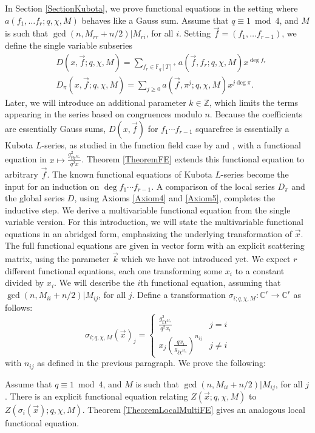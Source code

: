 \documentclass[11pt,letterpaper]{article}
\newenvironment{manualtheorem}[1]{%
  \IfBlankTF{#1}
    {\renewcommand{\themanualtheoreminner}{\unskip}}
    {\renewcommand\themanualtheoreminner{#1}}%
  \manualtheoreminner
}{\endmanualtheoreminner}
\theoremstyle{definition}
\theoremstyle{remark}
\numberwithin{equation}{section}
\theoremstyle{dotless}
\newcommand{\C}{\mathbb{C}}
\newcommand{\Z}{\mathbb{Z}}
\newcommand{\F}{\mathbb{F}}
\begin{document}
In Section \ref{SectionKubota}, we prove functional equations in the setting where $a(f_1, \ldots f_r; q, \chi, M)$ behaves like a Gauss sum. Assume that $q \equiv 1 \bmod 4$, and $M$ is such that $\gcd(n, M_{rr}+n/2) | M_{ri}$, for all $i$. Setting $\vec{f}=(f_1, \ldots f_{r-1})$, we define the single variable subseries
\begin{align}
&D(x, \vec{f}; q, \chi, M) = \sum_{f_r \in \F_q[T]^+} a(\vec{f}, f_r; q, \chi, M) x^{\deg f_r} \\
&D_\pi(x, \vec{f}; q, \chi, M) = \sum_{j\geq 0} a(\vec{f}, \pi^j; q, \chi, M) x^{j\deg \pi}.
\end{align}
Later, we will introduce an additional parameter $k \in \Z$, which limits the terms appearing in the series based on congruences modulo $n$. Because the coefficients are essentially Gauss sums, $D(x, \vec{f})$ for $f_1\cdots f_{r-1}$ squarefree is essentially a Kubota $L$-series, as studied in the function field case by \cite{Hoffstein} and \cite{Patterson}, with a functional equation in $x \mapsto \frac{g_{\xi \chi^{M_{rr}}}^2}{q^2x}$. Theorem \ref{TheoremFE} extends this functional equation to arbitrary $\vec{f}$. The known functional equations of Kubota $L$-series become the input for an induction on $\deg f_1\cdots f_{r-1}$. A comparison of the local series $D_\pi$ and the global series $D$, using Axioms \ref{Axiom4} and \ref{Axiom5}, completes the inductive step. We derive a multivariable functional equation from the single variable version. For this introduction, we will state the multivariable functional equations in an abridged form, emphasizing the underlying transformation of $\vec{x}$. The full functional equations are given in vector form with an explicit scattering matrix, using the parameter $\vec{k}$ which we have not introduced yet. We expect $r$ different functional equations, each one transforming some $x_i$ to a constant divided by $x_i$. We will describe the $i$th functional equation, assuming that $\gcd(n, M_{ii}+n/2) | M_{ij}$, for all $j$. Define a transformation $\sigma_{i; q, \chi, M}: \C^r \to \C^r$ as follows:
\begin{equation}
\sigma_{i; q, \chi, M}(\vec{x})_j = \left\lbrace \begin{array}{cc} 
\frac{g_{\xi \chi^{M_{ii}}}^2}{q^2x_i} & j=i \\
x_j\left(\frac{q x_i}{g_{\xi \chi^{M_{ii}}}}\right)^{n_{ij}} & j \neq i \end{array} \right. 
\end{equation}
with $n_{ij}$ as defined in the previous paragraph. We prove the following:
\begin{manualtheorem}{\ref{TheoremMultiFE}}
Assume that $q \equiv 1 \bmod 4$, and $M$ is such that $\gcd(n, M_{ii}+n/2) | M_{ij}$, for all $j$. There is an explicit functional equation relating $Z(\vec{x}; q, \chi, M)$ to $Z(\sigma_i(\vec{x}); q, \chi, M)$.
\end{manualtheorem}
\noindent Theorem \ref{TheoremLocalMultiFE} gives an analogous local functional equation.
\end{document}
